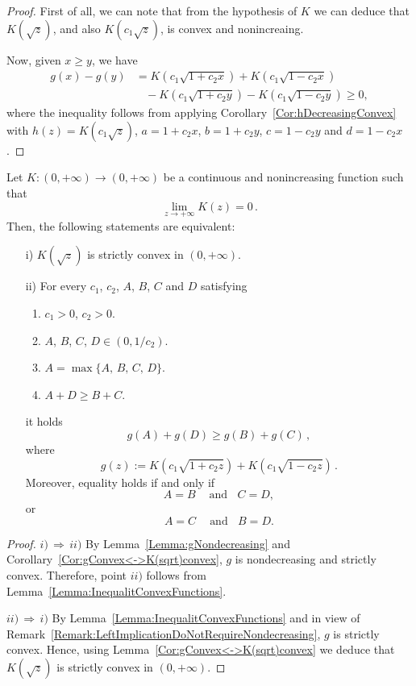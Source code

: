 \begin{proof}
First of all, we can note that from the hypothesis of $K$ we can deduce that $K(\sqrt{z})$, and also $K(c_1\sqrt{z})$, is convex and nonincreaing.

Now, given $x\geq y$, we have
\begin{align*}
g(x)-g(y) &= K(c_1\sqrt{1+c_2 x}) + K(c_1\sqrt{1-c_2 x}) \\
&\ \ \ \ - K(c_1\sqrt{1+c_2 y}) -K(c_1\sqrt{1-c_2 y}) \geq 0,
\end{align*}
where the inequality follows from applying Corollary~\ref{Cor:hDecreasingConvex} with $h(z) = K(c_1\sqrt{z})$, $a=1+c_2x$, $b=1+c_2y$, $c=1-c_2y$ and $d=1-c_2x$.
\end{proof}


\begin{proposition}
\label{Prop:EquivalenceK(sqrt)Convex<->Inequality}
Let $K:(0, +\infty) \to (0,+\infty)$ be a continuous and nonincreasing function such that
$$
\lim_{z\to +\infty} K(z) = 0\,.
$$
Then, the following statements are equivalent:
\begin{enumerate}
\item[i)] $K(\sqrt{z})$ is strictly convex in $(0, +\infty)$.
\item[ii)] For every $c_1$, $c_2$, $A$, $B$, $C$ and $D$ satisfying
  \begin{enumerate}
    \item $c_1 > 0$, $c_2>0$.
    \item $A$, $B$, $C$, $D \in (0, 1/c_2)$.
	\item $A = \max\{A,\, B,\, C,\, D\}$.
    \item $A + D \geq B + C$.
  \end{enumerate}
  it holds
  $$
  g(A) + g(D) \geq g(B) + g(C)\,,
  $$
  where
  $$
  g(z) := K(c_1 \sqrt{1 + c_2z}) + K(c_1 \sqrt{1 - c_2z})\,.
  $$
  Moreover, equality holds if and only if
  $$ A = B \ \ \ \ \textrm{ and} \ \ \ \ C=D, $$
  or
  $$ A = C \ \ \ \ \textrm{ and} \ \ \ \ B=D. $$
\end{enumerate}
\end{proposition}

\begin{proof}
$i)\, \Rightarrow \,ii)$
By Lemma~\ref{Lemma:gNondecreasing} and Corollary~\ref{Cor:gConvex<->K(sqrt)convex}, $g$ is nondecreasing and strictly convex. Therefore, point $ii)$ follows from Lemma~\ref{Lemma:InequalitConvexFunctions}.

$ii)\, \Rightarrow \,i)$
By Lemma~\ref{Lemma:InequalitConvexFunctions} and in view of Remark~\ref{Remark:LeftImplicationDoNotRequireNondecreasing}, $g$ is strictly convex. Hence, using Lemma~\ref{Cor:gConvex<->K(sqrt)convex} we deduce that $K(\sqrt{z})$ is strictly convex in $(0, +\infty)$.
\end{proof}


